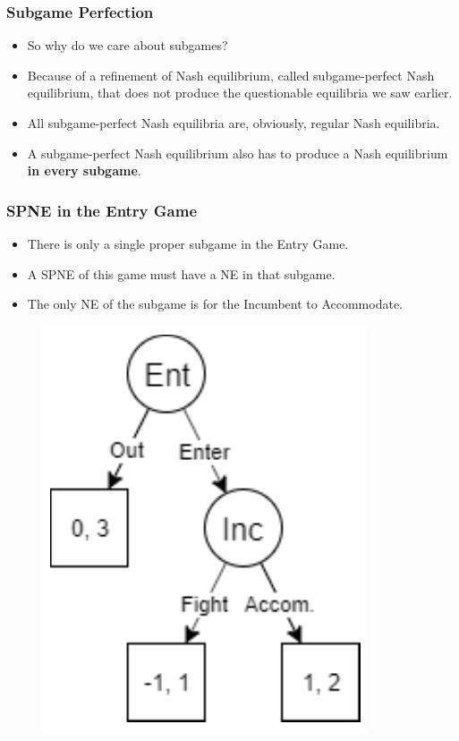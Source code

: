 \begin{frame}
\frametitle{Subgame Perfection}
\begin{itemize}
\item So why do we care about subgames?
\item Because of a refinement of Nash equilibrium, called \alert{subgame-perfect Nash equilibrium}, that does not produce the questionable equilibria we saw earlier.
\item All subgame-perfect Nash equilibria are, obviously, regular Nash equilibria.
\item A subgame-perfect Nash equilibrium also has to produce a Nash equilibrium \textbf{in every subgame}.
\end{itemize}
\end{frame}

\begin{frame}
\frametitle{SPNE in the Entry Game}
\begin{itemize}
\item There is only a single proper subgame in the Entry Game.
\item A SPNE of this game must have a NE in that subgame.
\item The only NE of the subgame is for the Incumbent to Accommodate.
\end{itemize}
\begin{figure}
\centering
\includegraphics[width=.5\textwidth]{figures/08InferiorEntrant.png}
\end{figure}
\end{frame}


